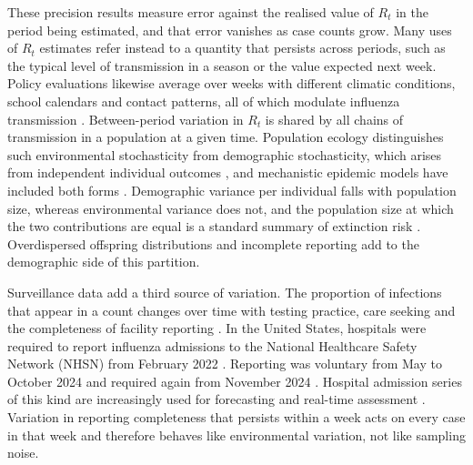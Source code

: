 These precision results measure error against the realised value of $R_t$ in the period being estimated, and that error vanishes as case counts grow. Many uses of $R_t$ estimates refer instead to a quantity that persists across periods, such as the typical level of transmission in a season or the value expected next week. Policy evaluations likewise average over weeks with different climatic conditions, school calendars and contact patterns, all of which modulate influenza transmission \citep{cauchemez2008estimating, shaman2009absolute, shaman2010absolute}. Between-period variation in $R_t$ is shared by all chains of transmission in a population at a given time. Population ecology distinguishes such environmental stochasticity from demographic stochasticity, which arises from independent individual outcomes \citep{engen1998demographic, rohani2002determinism, lande2003stochastic}, and mechanistic epidemic models have included both forms \citep{breto2009time}. Demographic variance per individual falls with population size, whereas environmental variance does not, and the population size at which the two contributions are equal is a standard summary of extinction risk \citep{lande1993risks, lande2003stochastic}. Overdispersed offspring distributions \citep{lloydsmith2005superspreading, endo2020estimating} and incomplete reporting add to the demographic side of this partition.

Surveillance data add a third source of variation. The proportion of infections that appear in a count changes over time with testing practice, care seeking and the completeness of facility reporting \citep{azmon2014estimating, stoner2019hierarchical, parag2022fundamental}. In the United States, hospitals were required to report influenza admissions to the National Healthcare Safety Network (NHSN) from February 2022 \citep{cdc2022flusight, frutos2025evaluation}. Reporting was voluntary from May to October 2024 and required again from November 2024 \citep{cms2024reporting, cdc2026nhsn}. Hospital admission series of this kind are increasingly used for forecasting and real-time assessment \citep{mathis2024evaluation}. Variation in reporting completeness that persists within a week acts on every case in that week and therefore behaves like environmental variation, not like sampling noise.

